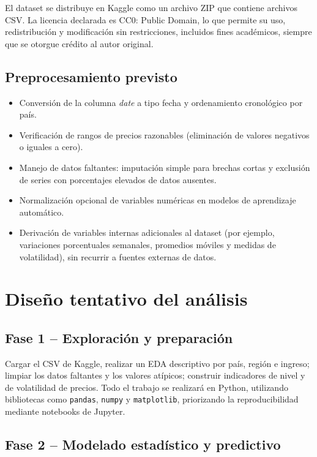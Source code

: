 \documentclass[stu, 12pt, a4paper, biblatex, donotrepeattitle]{apa7}
\begin{document}
El dataset se distribuye en Kaggle como un archivo ZIP que contiene archivos CSV. La licencia declarada es CC0: Public Domain, lo que permite su uso, redistribución y modificación sin restricciones, incluidos fines académicos, siempre que se otorgue crédito al autor original.

\subsection{Preprocesamiento previsto}

\begin{itemize}
  \item Conversión de la columna \textit{date} a tipo fecha y ordenamiento cronológico por país.
  \item Verificación de rangos de precios razonables (eliminación de valores negativos o iguales a cero).
  \item Manejo de datos faltantes: imputación simple para brechas cortas y exclusión de series con porcentajes elevados de datos ausentes.
  \item Normalización opcional de variables numéricas en modelos de aprendizaje automático.
  \item Derivación de variables internas adicionales al dataset (por ejemplo, variaciones porcentuales semanales, promedios móviles y medidas de volatilidad), sin recurrir a fuentes externas de datos.
\end{itemize}

\section{Diseño tentativo del análisis}

\subsection{Fase 1 -- Exploración y preparación}

Cargar el CSV de Kaggle, realizar un EDA descriptivo por país, región e ingreso; limpiar los datos faltantes y los valores atípicos; construir indicadores de nivel y de volatilidad de precios. Todo el trabajo se realizará en Python, utilizando bibliotecas como \texttt{pandas}, \texttt{numpy} y \texttt{matplotlib}, priorizando la reproducibilidad mediante notebooks de Jupyter.

\subsection{Fase 2 -- Modelado estadístico y predictivo}
\end{document}
